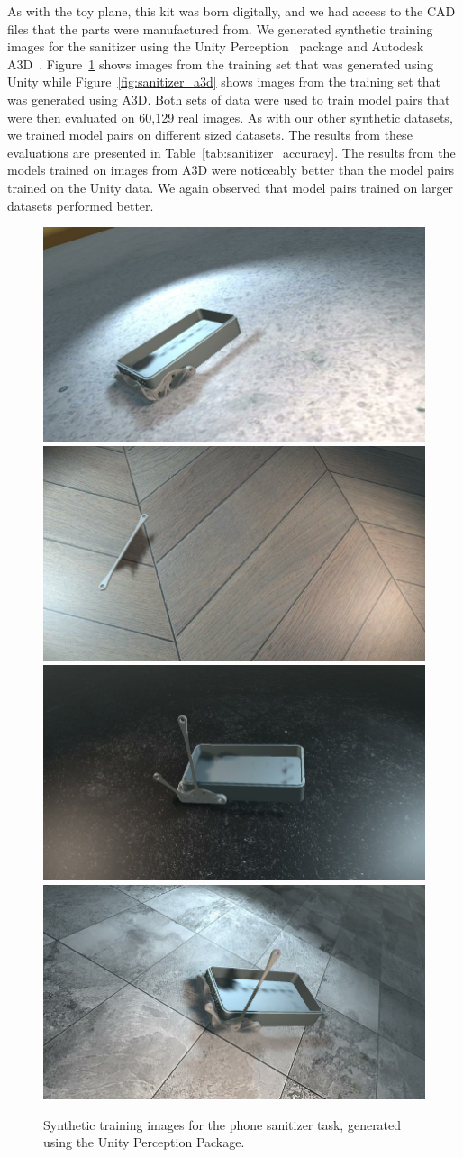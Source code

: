 As with the toy plane, this kit was born digitally, and we had access to the
CAD files that the parts were manufactured from.
We generated synthetic training images for the sanitizer using the Unity
Perception~\cite{unity} package and Autodesk A3D~\cite{Wang_2022_CVPR}.
Figure~\ref{fig:sanitizer_unity} shows images from the training set that was
generated using Unity while Figure~\ref{fig:sanitizer_a3d}
shows images from the training set that was generated using
A3D.
Both sets of data were used to train model pairs that were then evaluated on
60,129 real images.
As with our other synthetic datasets, we trained model pairs on different sized
datasets.
The results from these evaluations are presented in
Table~\ref{tab:sanitizer_accuracy}.
The results from the models trained on images from A3D were noticeably better
than the model pairs trained on the Unity data.
We again observed that model pairs trained on larger datasets performed better.

\begin{figure}
  \includegraphics[width=0.5\columnwidth]{figures/sanitizer/unity1.png}
  \includegraphics[width=0.5\columnwidth]{figures/sanitizer/unity2.png}
  \includegraphics[width=0.5\columnwidth]{figures/sanitizer/unity3.png}
  \includegraphics[width=0.5\columnwidth]{figures/sanitizer/unity4.png}
  \caption{
    Synthetic training images for the phone sanitizer task, generated using the
    Unity Perception Package.
  }\label{fig:sanitizer_unity}
\end{figure}

